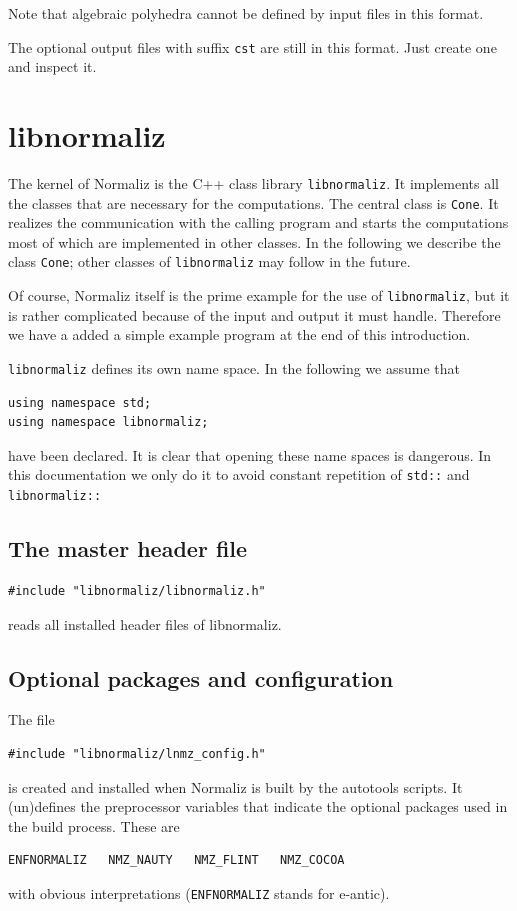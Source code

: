 Note that algebraic polyhedra cannot be defined by input files in this format.

The optional output files with suffix \verb|cst| are still in this format. Just create one and inspect it.

\newpage

\section{libnormaliz}\label{libnorm}

\begin{small}

The kernel of Normaliz is the C++ class library \verb|libnormaliz|. It implements all the classes that are necessary for the computations. The central class is \verb|Cone|. It realizes the communication with the calling program and starts the computations most of which are implemented in other classes. In the following we describe the class \verb|Cone|; other classes of \verb|libnormaliz| may follow in the future.

Of course, Normaliz itself is the prime example for the use of \verb|libnormaliz|, but it is rather complicated because of the input and output it must handle. Therefore we have a added a simple example program at the end of this introduction.

\verb|libnormaliz| defines its own name space. In the following we assume that
\begin{Verbatim}
using namespace std;
using namespace libnormaliz;
\end{Verbatim}
have been declared. It is clear that opening these name spaces is dangerous. In this documentation we only do it to avoid constant repetition of \verb|std::| and \verb|libnormaliz::|

\subsection{The master header file}

\begin{Verbatim}
#include "libnormaliz/libnormaliz.h"
\end{Verbatim}
reads all installed header files of libnormaliz.

\subsection{Optional packages and configuration}

The file
\begin{Verbatim}
#include "libnormaliz/lnmz_config.h"
\end{Verbatim}
is created and installed when Normaliz is built by the autotools scripts. It (un)defines the preprocessor variables that indicate the optional packages used in the build process. These are
\begin{Verbatim}
ENFNORMALIZ   NMZ_NAUTY   NMZ_FLINT   NMZ_COCOA 
\end{Verbatim}
with obvious interpretations (\verb|ENFNORMALIZ| stands for e-antic).


\end{small}
